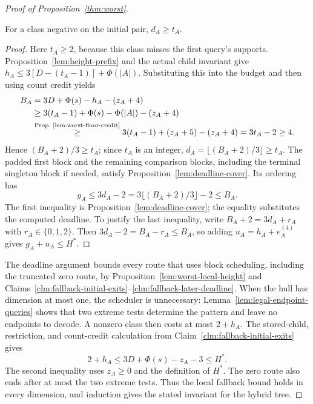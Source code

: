 \begin{proof}[Proof of Proposition~\ref{thm:worst}]
\begin{claim}
\label{clm:fallback-later-deadline}
For a class negative on the initial pair, $d_A\ge t_A$.
\end{claim}
\begin{proof}
Here $t_A\ge2$, because this class misses the first query's
supports. Proposition~\ref{lem:height-prefix} and the actual
child invariant give
$h_A\le3[D-(t_A-1)]+\Phi(|A|)$. Substituting this into the
budget and then using count credit yields
\begin{align*}
 B_A&=3D+\Phi(s)-h_A-(z_A+4)\\
    &\ge3(t_A-1)+\Phi(s)-\Phi(|A|)-(z_A+4)\\
    &\byref{Prop.}{lem:worst-floor-credit}{\ge}3(t_A-1)+(z_A+5)-(z_A+4)
      =3t_A-2\ge4.
\end{align*}
Hence $(B_A+2)/3\ge t_A$; since $t_A$ is an integer,
$d_A=\lfloor(B_A+2)/3\rfloor\ge t_A$.
The padded first block and the remaining comparison blocks, including
the terminal singleton block if needed, satisfy
Proposition~\ref{lem:deadline-cover}. Its ordering has
\[
 g_A\le3d_A-2=3\lfloor(B_A+2)/3\rfloor-2\le B_A.
\]
The first inequality is Proposition~\ref{lem:deadline-cover};
the equality substitutes the computed deadline.
To justify the last inequality, write $B_A+2=3d_A+r_A$ with
$r_A\in\{0,1,2\}$. Then $3d_A-2=B_A-r_A\le B_A$,
so adding $u_A=h_A+e_A^{(4)}$ gives $g_A+u_A\le H^*$.
\end{proof}
The deadline argument bounds every route that uses block scheduling,
including the truncated zero route, by
Proposition~\ref{lem:worst-local-height} and
Claims~\ref{clm:fallback-initial-exits}--\ref{clm:fallback-later-deadline}.
When the hull has dimension at most one, the scheduler is unnecessary:
Lemma~\ref{lem:legal-endpoint-queries} shows that two extreme tests
determine the pattern and leave no endpoints to decode. A nonzero class
then costs at most $2+h_A$. The stored-child, restriction, and
count-credit calculation from Claim~\ref{clm:fallback-initial-exits}
gives
\[
 2+h_A\le3D+\Phi(s)-z_A-3\le H^*.
\]
The second inequality uses $z_A\ge0$ and the definition of $H^*$.
The zero route also ends after at most the two extreme tests. Thus the
local fallback bound holds in every dimension, and induction gives the
stated invariant for the hybrid tree.
\end{proof}
